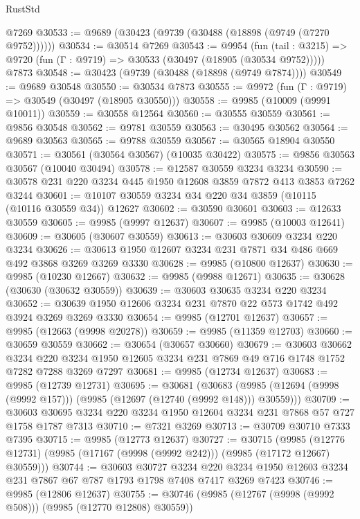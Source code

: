 \begin{lexlean}{RustStd}
\begin{coremodule}
    @7269
@30533 := @9689 (@30423 (@9739 (@30488 (@18898 (@9749 (@7270 @9752))))))
@30534 := @30514 @7269
@30543 := @9954
    (fun (tail : @3215) => @9720 (fun (Γ : @9719) => @30533 (@30497 (@18905 (@30534 @9752)))))
    @7873
@30548 := @30423 (@9739 (@30488 (@18898 (@9749 @7874))))
@30549 := @9689 @30548
@30550 := @30534 @7873
@30555 := @9972 (fun (Γ : @9719) => @30549 (@30497 (@18905 @30550)))
@30558 := @9985 (@10009 (@9991 @10011))
@30559 := @30558 @12564
@30560 := @30555 @30559
@30561 := @9856 @30548
@30562 := @9781 @30559
@30563 := @30495 @30562
@30564 := @9689 @30563
@30565 := @9788 @30559
@30567 := @30565 @18904 @30550
@30571 := @30561 (@30564 @30567) (@10035 @30422)
@30575 := @9856 @30563 @30567 (@10040 @30494)
@30578 := @12587 @30559 @3234 @3234
@30590 := @30578 @231 @220 @3234 @445 @1950 @12608 @3859 @7872 @413 @3853 @7262 @3244
@30601 := @10107 @30559 @3234 @34 @220 @34 @3859 (@10115 (@10116 @30559 @34)) @12627
@30602 := @30590 @30601
@30603 := @12633 @30559
@30605 := @9985 (@9997 @12637)
@30607 := @9985 (@10003 @12641)
@30609 := @30605 (@30607 @30559)
@30613 := @30603 @30609 @3234 @220 @3234
@30626 := @30613 @1950 @12607 @3234 @231 @7871 @34 @486 @669 @492 @3868 @3269 @3269 @3330
@30628 := @9985 (@10800 @12637)
@30630 := @9985 (@10230 @12667)
@30632 := @9985 (@9988 @12671)
@30635 := @30628 (@30630 (@30632 @30559))
@30639 := @30603 @30635 @3234 @220 @3234
@30652 := @30639 @1950 @12606 @3234 @231 @7870 @22 @573 @1742 @492 @3924 @3269 @3269 @3330
@30654 := @9985 (@12701 @12637)
@30657 := @9985 (@12663 (@9998 @20278))
@30659 := @9985 (@11359 @12703)
@30660 := @30659 @30559
@30662 := @30654 (@30657 @30660)
@30679 := @30603
    @30662
    @3234
    @220
    @3234
    @1950
    @12605
    @3234
    @231
    @7869
    @49
    @716
    @1748
    @1752
    @7282
    @7288
    @3269
    @7297
@30681 := @9985 (@12734 @12637)
@30683 := @9985 (@12739 @12731)
@30695 := @30681
    (@30683 (@9985 (@12694 (@9998 (@9992 @157))) (@9985 (@12697 (@12740 (@9992 @148))) @30559)))
@30709 := @30603 @30695 @3234 @220 @3234 @1950 @12604 @3234 @231 @7868 @57 @727 @1758 @1787 @7313
@30710 := @7321 @3269
@30713 := @30709 @30710 @7333 @7395
@30715 := @9985 (@12773 @12637)
@30727 := @30715
    (@9985 (@12776 @12731) (@9985 (@17167 (@9998 (@9992 @242))) (@9985 (@17172 @12667) @30559)))
@30744 := @30603
    @30727
    @3234
    @220
    @3234
    @1950
    @12603
    @3234
    @231
    @7867
    @67
    @787
    @1793
    @1798
    @7408
    @7417
    @3269
    @7423
@30746 := @9985 (@12806 @12637)
@30755 := @30746 (@9985 (@12767 (@9998 (@9992 @508))) (@9985 (@12770 @12808) @30559))

\end{coremodule}
\end{lexlean}
